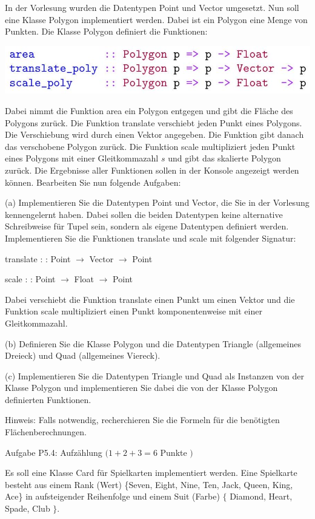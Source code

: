 \documentclass[10pt]{article}
\begin{document}
In der Vorlesung wurden die Datentypen Point und Vector umgesetzt. Nun soll eine Klasse Polygon implementiert werden. Dabei ist ein Polygon eine Menge von Punkten. Die Klasse Polygon definiert die Funktionen:

\includegraphics[max width=\textwidth]{2022_11_15_0a5a2eee0aef383b0ce9g-2(1)}

Dabei nimmt die Funktion area ein Polygon entgegen und gibt die Fläche des Polygons zurück. Die Funktion translate verschiebt jeden Punkt eines Polygons. Die Verschiebung wird durch einen Vektor angegeben. Die Funktion gibt danach das verschobene Polygon zurück. Die Funktion scale multipliziert jeden Punkt eines Polygons mit einer Gleitkommazahl $s$ und gibt das skalierte Polygon zurück. Die Ergebnisse aller Funktionen sollen in der Konsole angezeigt werden können. Bearbeiten Sie nun folgende Aufgaben:

(a) Implementieren Sie die Datentypen Point und Vector, die Sie in der Vorlesung kennengelernt haben. Dabei sollen die beiden Datentypen keine alternative Schreibweise für Tupel sein, sondern als eigene Datentypen definiert werden. Implementieren Sie die Funktionen translate und scale mit folgender Signatur:

translate : : Point $\rightarrow$ Vector $\rightarrow$ Point

scale : : Point $\rightarrow$ Float $\rightarrow$ Point

Dabei verschiebt die Funktion translate einen Punkt um einen Vektor und die Funktion scale multipliziert einen Punkt komponentenweise mit einer Gleitkommazahl.

(b) Definieren Sie die Klasse Polygon und die Datentypen Triangle (allgemeines Dreieck) und Quad (allgemeines Viereck).

(c) Implementieren Sie die Datentypen Triangle und Quad als Instanzen von der Klasse Polygon und implementieren Sie dabei die von der Klasse Polygon definierten Funktionen.

Hinweis: Falls notwendig, recherchieren Sie die Formeln für die benötigten Flächenberechnungen.

Aufgabe P5.4: Aufzählung $(1+2+3=6$ Punkte $)$

Es soll eine Klasse Card für Spielkarten implementiert werden. Eine Spielkarte besteht aus einem Rank (Wert) \{Seven, Eight, Nine, Ten, Jack, Queen, King, Ace\} in aufsteigender Reihenfolge und einem Suit (Farbe) $\{$ Diamond, Heart, Spade, Club $\}$.
\end{document}
